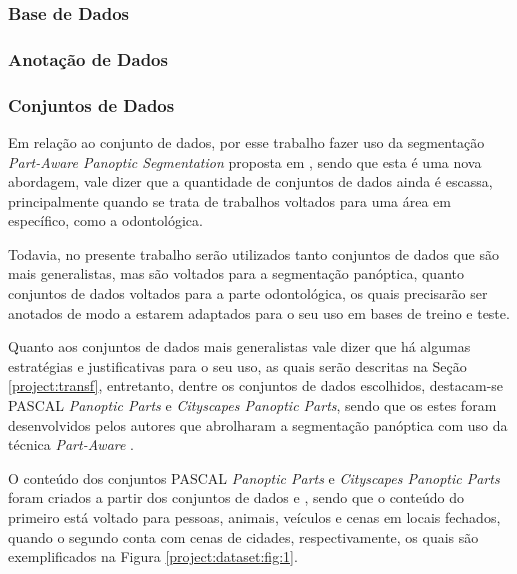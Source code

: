 \subsubsection{Base de Dados}
\label{project:database}



\subsubsection{Anotação de Dados}
\label{project:annotation}



\subsubsection{Conjuntos de Dados}
\label{project:dataset}
Em relação ao conjunto de dados, por esse trabalho fazer uso da segmentação \textit{Part-Aware Panoptic Segmentation} proposta em \cite{DeGeus2021}, sendo que esta é uma nova abordagem, vale dizer que a quantidade de conjuntos de dados ainda é escassa, principalmente quando se trata de trabalhos voltados para uma área em específico, como a odontológica.

Todavia, no presente trabalho serão utilizados tanto conjuntos de dados que são mais generalistas, mas são voltados para a segmentação panóptica, quanto conjuntos de dados voltados para a parte odontológica, os quais precisarão ser anotados de modo a estarem adaptados para o seu uso em bases de treino e teste.

Quanto aos conjuntos de dados mais generalistas vale dizer que há algumas estratégias e justificativas para o seu uso, as quais serão descritas na Seção \ref{project:transf}, entretanto, dentre os conjuntos de dados escolhidos, destacam-se PASCAL \textit{Panoptic Parts} e \textit{Cityscapes Panoptic Parts}, sendo que os estes foram desenvolvidos pelos autores que abrolharam a segmentação panóptica com uso da técnica \textit{Part-Aware} \cite{DeGeus2021}.

O conteúdo dos conjuntos PASCAL \textit{Panoptic Parts} e \textit{Cityscapes Panoptic Parts} foram criados a partir dos conjuntos de dados \cite{everingham2010pascal} e \cite{Cordts2016}, sendo que o conteúdo do primeiro está voltado para pessoas, animais, veículos e cenas em locais fechados, quando o segundo conta com cenas de cidades, respectivamente, os quais são exemplificados na Figura \ref{project:dataset:fig:1}.

